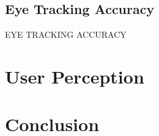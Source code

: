 \documentclass[a4paper,11pt]{article}
\begin{document}
\subsection{Eye Tracking Accuracy}
EYE TRACKING ACCURACY

\section{User Perception}

\section{Conclusion}

\printbibliography
\end{document}
